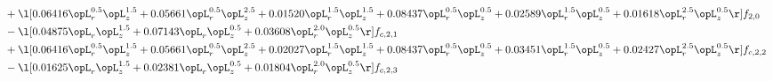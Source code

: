 \begin{alignat}{2}
& + \l[  0.06416 \opL_r^{0.5} \opL_z^{1.5} +  0.05661 \opL_r^{0.5} \opL_z^{2.5} +  0.01520 \opL_r^{1.5} \opL_z^{1.5} +  0.08437 \opL_r^{0.5} \opL_z^{0.5} +  0.02589 \opL_r^{1.5} \opL_z^{0.5} +  0.01618 \opL_r^{2.5} \opL_z^{0.5}  \r] f_{2,0} \nonumber \\ 
& - \l[  0.04875 \opL_r \opL_z^{1.5} +  0.07143 \opL_r \opL_z^{0.5} +  0.03608 \opL_r^{2.0} \opL_z^{0.5}  \r] f_{c,2,1} \nonumber \\ 
& + \l[  0.06416 \opL_r^{0.5} \opL_z^{1.5} +  0.05661 \opL_r^{0.5} \opL_z^{2.5} +  0.02027 \opL_r^{1.5} \opL_z^{1.5} +  0.08437 \opL_r^{0.5} \opL_z^{0.5} +  0.03451 \opL_r^{1.5} \opL_z^{0.5} +  0.02427 \opL_r^{2.5} \opL_z^{0.5}  \r] f_{c,2,2} \nonumber \\ 
& - \l[  0.01625 \opL_r \opL_z^{1.5} +  0.02381 \opL_r \opL_z^{0.5} +  0.01804 \opL_r^{2.0} \opL_z^{0.5}  \r] f_{c,2,3} \nonumber \\ 
\end{alignat} 


